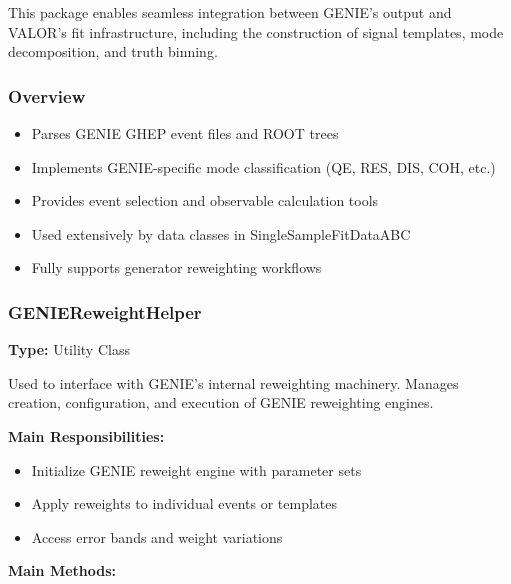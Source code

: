 This package enables seamless integration between GENIE’s output and VALOR’s fit infrastructure, including the construction of signal templates, mode decomposition, and truth binning.

\vspace{1em}
\subsubsection*{Overview}

\begin{itemize}
  \item Parses GENIE GHEP event files and ROOT trees
  \item Implements GENIE-specific mode classification (QE, RES, DIS, COH, etc.)
  \item Provides event selection and observable calculation tools
  \item Used extensively by data classes in {\color{cadmiumgreen} SingleSampleFitDataABC}
  \item Fully supports generator reweighting workflows
\end{itemize}

\vspace{1em}
\subsubsection*{\color{cadmiumgreen}\bf GENIEReweightHelper}

\textbf{Type:} Utility Class

Used to interface with GENIE’s internal reweighting machinery.  
Manages creation, configuration, and execution of GENIE reweighting engines.

\vspace{0.5em}
\noindent\textbf{Main Responsibilities:}

\begin{itemize}
  \item Initialize GENIE reweight engine with parameter sets
  \item Apply reweights to individual events or templates
  \item Access error bands and weight variations
\end{itemize}

\vspace{0.5em}
\noindent\textbf{Main Methods:}

